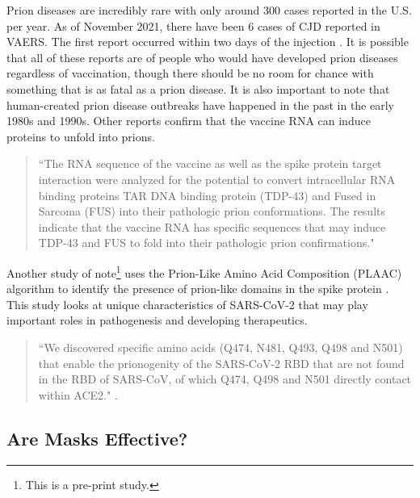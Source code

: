 \documentclass[10pt, a4paper, twocolumn]{book}
\begin{document}
Prion diseases are incredibly rare with only around 300 cases reported in the U.S. per year. As of November 2021, there have been 6 cases of CJD reported in VAERS. The first report occurred within two days of the injection \citep{PrionDiseasesInVAERS}. It is possible that all of these reports are of people who would have developed prion diseases regardless of vaccination, though there should be no room for chance with something that is as fatal as a prion disease. It is also important to note that human-created prion disease outbreaks have happened in the past in the early 1980s and 1990s. Other reports confirm that the vaccine RNA can induce proteins to unfold into prions.

\begin{quotation}
	``The RNA sequence of the vaccine as well as the spike protein target interaction were analyzed for the
	potential to convert intracellular RNA binding proteins TAR DNA binding protein (TDP-43) and Fused in Sarcoma	(FUS) into their pathologic prion conformations. The results indicate that the vaccine RNA has specific sequences that may induce TDP-43 and FUS to fold into their pathologic prion confirmations." \citep{RNAVaccinesAndPrionDisease}
\end{quotation}

Another study of note\footnote{This is a pre-print study.} uses the Prion-Like Amino Acid Composition (PLAAC) algorithm to identify the presence of prion-like domains in the spike protein \citep{SARSPrionLikeDomains}. This study looks at unique characteristics of SARS-CoV-2 that may play important roles in pathogenesis and developing therapeutics. 

\begin{quotation}
	``We discovered specific amino acids (Q474, N481, Q493, Q498 and N501) that enable the prionogenity of the SARS-CoV-2 RBD that are not found in the RBD of SARS-CoV, of which Q474, Q498 and N501 directly contact within ACE2." \citep{SARSPrionLikeDomains}. 
\end{quotation}


















\subsection{Are Masks Effective?}
\end{document}
